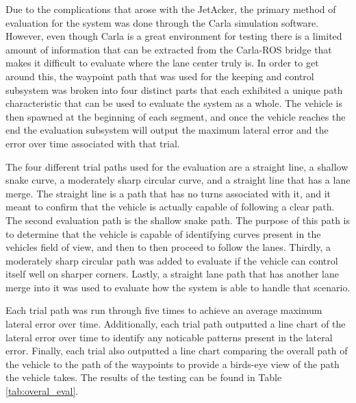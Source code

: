 \documentclass[titlepage,draft]{article}
\begin{document}
{Due to the complications that arose with the JetAcker, the primary method of evaluation for the system was done through the Carla simulation software. However, even though Carla is a great environment for testing there is a limited amount of information that can be extracted from the Carla-ROS bridge that makes it difficult to evaluate where the lane center truly is. In order to get around this, the waypoint path that was used for the keeping and control subsystem was broken into four distinct parts that each exhibited a unique path characteristic that can be used to evaluate the system as a whole. The vehicle is then spawned at the beginning of each segment, and once the vehicle reaches the end the evaluation subsystem will output the maximum lateral error and the error over time associated with that trial.

The four different trial paths used for the evaluation are a straight line, a shallow snake curve, a moderately sharp circular curve, and a straight line that has a lane merge. The straight line is a path that has no turns associated with it, and it meant to confirm that the vehicle is actually capable of following a clear path. The second evaluation path is the shallow snake path. The purpose of this path is to determine that the vehicle is capable of identifying curves present in the vehicles field of view, and then to then proceed to follow the lanes. Thirdly, a moderately sharp circular path was added to evaluate if the vehicle can control itself well on sharper corners. Lastly, a straight lane path that has another lane merge into it was used to evaluate how the system is able to handle that scenario.

Each trial path was run through five times to achieve an average maximum lateral error over time. Additionally, each trial path outputted a line chart of the lateral error over time to identify any noticable patterns present in the lateral error. Finally, each trial also outputted a line chart comparing the overall path of the vehicle to the path of the waypoints to provide a birds-eye view of the path the vehicle takes. The results of the testing can be found in Table \ref{tab:overal_eval}.

}
\end{document}
